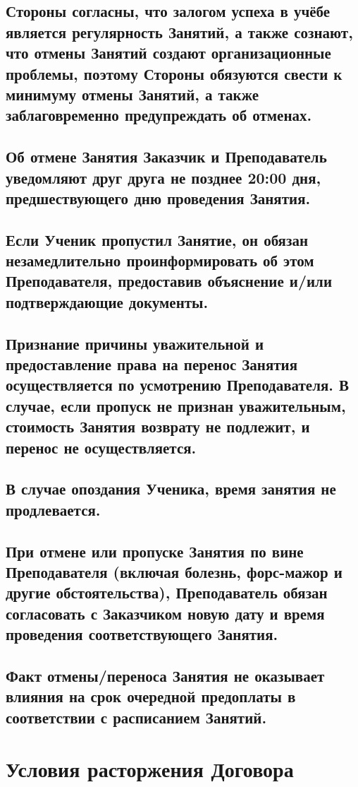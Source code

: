 \documentclass[a4paper,12pt]{article}
\begin{document}
\subsection{Стороны согласны, что залогом успеха в учёбе является регулярность Занятий, а также сознают, что отмены Занятий создают организационные проблемы, поэтому Стороны обязуются свести к минимуму отмены Занятий, а также заблаговременно предупреждать об отменах.}
\subsection{Об отмене Занятия Заказчик и Преподаватель уведомляют друг друга не позднее 20:00 дня, предшествующего дню проведения Занятия.}

\subsection{Если Ученик пропустил Занятие, он обязан незамедлительно проинформировать об этом Преподавателя, предоставив объяснение и/или подтверждающие документы.}

\subsection{Признание причины уважительной и предоставление права на перенос Занятия осуществляется по усмотрению Преподавателя. В случае, если пропуск не признан уважительным, стоимость Занятия возврату не подлежит, и перенос не осуществляется.}

\subsection{В случае опоздания Ученика, время занятия не продлевается.}

\subsection{При отмене или пропуске Занятия по вине Преподавателя (включая болезнь, форс-мажор и другие обстоятельства), Преподаватель обязан согласовать с Заказчиком новую дату и время проведения соответствующего Занятия.}


\subsection{Факт отмены/переноса Занятия не оказывает влияния на срок очередной предоплаты в соответствии с расписанием Занятий.}
\Large\section{Условия расторжения Договора}
\end{document}
